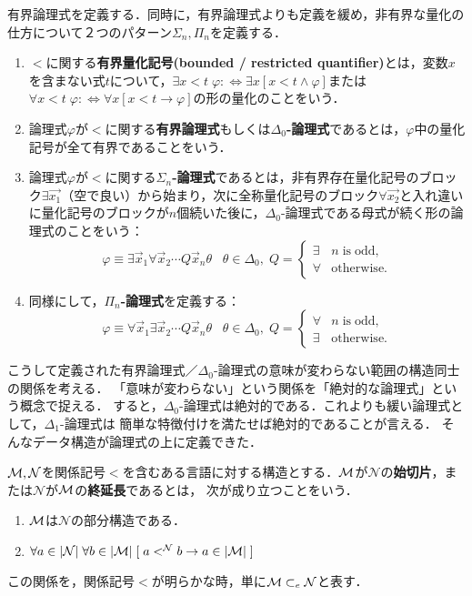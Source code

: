 \documentclass[uplatex, dvipdfmx]{jsreport}
\begin{document}
有界論理式を定義する．同時に，有界論理式よりも定義を緩め，非有界な量化の仕方について２つのパターン$\Sigma_n,\Pi_n$を定義する．
\begin{definition}
    \begin{enumerate}
        \item $<$に関する\textbf{有界量化記号(bounded / restricted quantifier)}とは，変数$x$を含まない式$t$について，$\exists x<t\;\varphi:\Leftrightarrow\exists x[x<t\land\varphi]$または$\forall x<t\;\varphi:\Leftrightarrow\forall x[x<t\to\varphi]$の形の量化のことをいう．
        \item 論理式$\varphi$が$<$に関する\textbf{有界論理式}もしくは\textbf{$\Delta_0$-論理式}であるとは，$\varphi$中の量化記号が全て有界であることをいう．
        \item 論理式$\varphi$が$<$に関する\textbf{$\Sigma_n$-論理式}であるとは，非有界存在量化記号のブロック$\exists\vec{x_1}$（空で良い）から始まり，次に全称量化記号のブロック$\forall\vec{x_2}$と入れ違いに量化記号のブロックが$n$個続いた後に，$\Delta_0$-論理式である母式が続く形の論理式のことをいう：\[\varphi\equiv\exists\vec{x}_1\forall\vec{x}_2\cdots Q\vec{x}_n\theta\;\;\;\theta\in\Delta_0,\;Q=\begin{cases}\exists&n\;\mathrm{is\;odd},\\\forall&\mathrm{otherwise}.\end{cases}\]
        \item 同様にして，\textbf{$\Pi_n$-論理式}を定義する：\[\varphi\equiv\forall\vec{x}_1\exists\vec{x}_2\cdots Q\vec{x}_n\theta\;\;\;\theta\in\Delta_0,\;Q=\begin{cases}\forall&n\;\mathrm{is\;odd},\\\exists&\mathrm{otherwise}.\end{cases}\]
    \end{enumerate}
\end{definition}
こうして定義された有界論理式／$\Delta_0$-論理式の意味が変わらない範囲の構造同士の関係を考える．
「意味が変わらない」という関係を「絶対的な論理式」という概念で捉える．
すると，$\Delta_0$-論理式は絶対的である．これよりも緩い論理式として，$\Delta_1$-論理式は
簡単な特徴付けを満たせば絶対的であることが言える．
そんなデータ構造が論理式の上に定義できた．

\begin{definition}
    $\mathcal{M},\mathcal{N}$を関係記号$<$を含むある言語に対する構造とする．$\mathcal{M}$が$\mathcal{N}$の\textbf{始切片}，または$\mathcal{N}$が$\mathcal{M}$の\textbf{終延長}であるとは，
    次が成り立つことをいう．
    \begin{enumerate}
        \item $\mathcal{M}$は$\mathcal{N}$の部分構造である．
        \item $\forall a\in|\mathcal{N}|\;\forall b\in|\mathcal{M}|\;[\;a<^\mathcal{N}b\to a\in|\mathcal{M}|\;]$
    \end{enumerate}
    この関係を，関係記号$<$が明らかな時，単に$\mathcal{M}\subset_e\mathcal{N}$と表す．
\end{definition}
\end{document}
